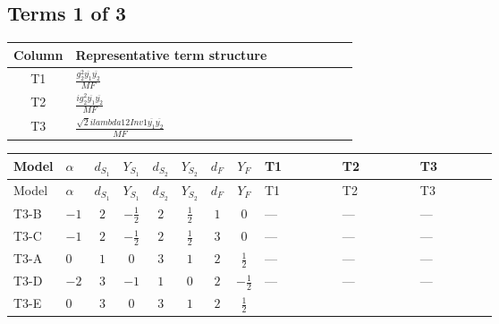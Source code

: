 \documentclass[8pt]{article}
\begin{document}
\begin{landscape}
\subsection*{Terms 1 of 3}
\begin{center}
\begin{tabular}{@{}c >{\raggedright\arraybackslash}p{0.82\linewidth}@{}}
\toprule
Column & Representative term structure \\
\midrule
T1 & \(\displaystyle \frac{g_{2}^{2} \overline{y_{1}} \overline{y_{2}}}{MF}\) \\
\midrule
T2 & \(\displaystyle \frac{i g_{2}^{2} \overline{y_{1}} \overline{y_{2}}}{MF}\) \\
\midrule
T3 & \(\displaystyle \frac{\sqrt{2} i lambda12Inv1 \overline{y_{1}} \overline{y_{2}}}{MF}\) \\
\midrule
\bottomrule
\end{tabular}
\end{center}
\smallskip
\tiny
\begin{longtable}{@{}llcccccc >{\raggedright\arraybackslash}p{0.21\linewidth} >{\raggedright\arraybackslash}p{0.21\linewidth} >{\raggedright\arraybackslash}p{0.21\linewidth}@{}}
\toprule
Model & $\alpha$ & $d_{S_1}$ & $Y_{S_1}$ & $d_{S_2}$ & $Y_{S_2}$ & $d_F$ & $Y_F$ & T1 & T2 & T3 \\
\midrule
\endfirsthead
\toprule
Model & $\alpha$ & $d_{S_1}$ & $Y_{S_1}$ & $d_{S_2}$ & $Y_{S_2}$ & $d_F$ & $Y_F$ & T1 & T2 & T3 \\
\midrule
\endhead
T3-B & $-1$ & $2$ & $-\frac{1}{2}$ & $2$ & $\frac{1}{2}$ & $1$ & $0$ & --- & --- & --- \\
\midrule
T3-C & $-1$ & $2$ & $-\frac{1}{2}$ & $2$ & $\frac{1}{2}$ & $3$ & $0$ & --- & --- & --- \\
\midrule
T3-A & $0$ & $1$ & $0$ & $3$ & $1$ & $2$ & $\frac{1}{2}$ & --- & --- & --- \\
\midrule
T3-D & $-2$ & $3$ & $-1$ & $1$ & $0$ & $2$ & $-\frac{1}{2}$ & --- & --- & --- \\
\midrule
T3-E & $0$ & $3$ & $0$ & $3$ & $1$ & $2$ & $\frac{1}{2}$ & \scriptsize\adjustbox{max width=\linewidth}{$\begin{gathered} - \frac{g_{2}^{2} \overline{y_{1}} \overline{y_{2}}}{2 MF}\end{gathered}$} & \scriptsize\adjustbox{max width=\linewidth}{$\begin{gathered} \frac{i g_{2}^{2} \overline{y_{1}} \overline{y_{2}}}{2 MF}\end{gathered}$} & \scriptsize\adjustbox{max width=\linewidth}{$\begin{gathered} - \frac{\sqrt{2} i lambda12Inv1 \overline{y_{1}} \overline{y_{2}}}{4 MF}\end{gathered}$} \\
\midrule
\bottomrule
\end{longtable}
\clearpage

\end{landscape}
\end{document}
